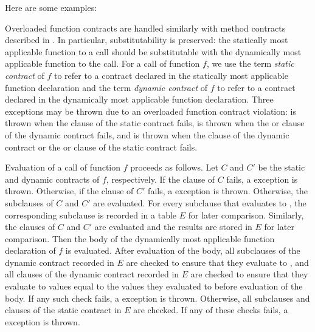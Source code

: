 Here are some examples:


Overloaded function contracts are handled similarly with method contracts
described in .  In particular, substitutability is
preserved: the statically most applicable function to a call should be
substitutable with the dynamically most applicable function to the call.
For a call of function $f$,
we use the term \emph{static contract} of $f$ to refer to
a contract declared in the statically most applicable function declaration
and the term \emph{dynamic contract} of $f$ to refer to a contract declared
in the dynamically most applicable function declaration.
Three exceptions may be thrown due to an overloaded function contract
violation:  is thrown when the  clause
of the static contract fails,  is thrown when the
 or  clause of the dynamic contract fails,
and  is thrown
when the  clause of the dynamic contract
or the  or  clause of the static contract fails.


Evaluation of a call of function $f$ proceeds as follows.
Let $C$ and $C'$ be the static and dynamic contracts of $f$, respectively.
If the  clause of $C$ fails,
a  exception is thrown.
%
Otherwise, if the  clause of $C'$ fails,
a  exception is thrown.
%
Otherwise, the  subclauses of $C$ and $C'$ are evaluated. For
every  subclause that evaluates to , the
corresponding  subclause is recorded in a table
$E$ for later comparison.  Similarly, the  clauses of $C$
and $C'$ are evaluated and the results are stored in $E$ for later
comparison.
%
Then the body of the dynamically most applicable function declaration of $f$
is evaluated.  After evaluation of the body,
%
all  subclauses of the dynamic contract recorded in $E$
are checked to ensure that they evaluate to , and
all  clauses of the dynamic contract recorded in $E$
are checked to ensure that they evaluate to values equal to the
values they evaluated to before evaluation of the body.
%
If any such check fails, a 
exception is thrown. Otherwise, all  subclauses and
 clauses of the static contract in $E$ are checked.
If any of these checks fails, a  exception
is thrown.

